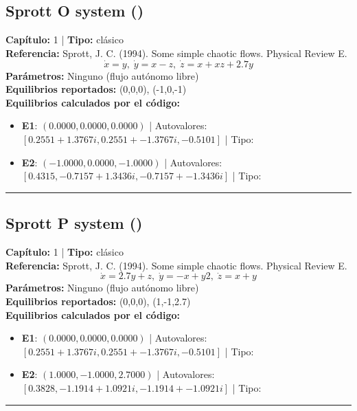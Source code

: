 \subsection*{Sprott O system ()}
\textbf{Capítulo:} 1 | \textbf{Tipo:} clásico\\
\textbf{Referencia:} Sprott, J. C. (1994). Some simple chaotic flows. Physical Review E.\\
\[\dot{x}=y, \; \dot{y}=x-z, \; \dot{z}=x+xz+2.7y\]
\textbf{Parámetros:} Ninguno (flujo autónomo libre)\\
\textbf{Equilibrios reportados:} (0,0,0), (-1,0,-1)\\
\textbf{Equilibrios calculados por el código:}
\begin{itemize}
  \item \textbf{E1}: $(0.0000, 0.0000, 0.0000)$ | Autovalores: $[0.2551 + 1.3767i, 0.2551 + -1.3767i, -0.5101]$ | Tipo: 
  \item \textbf{E2}: $(-1.0000, 0.0000, -1.0000)$ | Autovalores: $[0.4315, -0.7157 + 1.3436i, -0.7157 + -1.3436i]$ | Tipo: 
\end{itemize}
\hrule

\subsection*{Sprott P system ()}
\textbf{Capítulo:} 1 | \textbf{Tipo:} clásico\\
\textbf{Referencia:} Sprott, J. C. (1994). Some simple chaotic flows. Physical Review E.\\
\[\dot{x}=2.7y+z, \; \dot{y}=-x+y2, \; \dot{z}=x+y\]
\textbf{Parámetros:} Ninguno (flujo autónomo libre)\\
\textbf{Equilibrios reportados:} (0,0,0), (1,-1,2.7)\\
\textbf{Equilibrios calculados por el código:}
\begin{itemize}
  \item \textbf{E1}: $(0.0000, 0.0000, 0.0000)$ | Autovalores: $[0.2551 + 1.3767i, 0.2551 + -1.3767i, -0.5101]$ | Tipo: 
  \item \textbf{E2}: $(1.0000, -1.0000, 2.7000)$ | Autovalores: $[0.3828, -1.1914 + 1.0921i, -1.1914 + -1.0921i]$ | Tipo: 
\end{itemize}
\hrule

